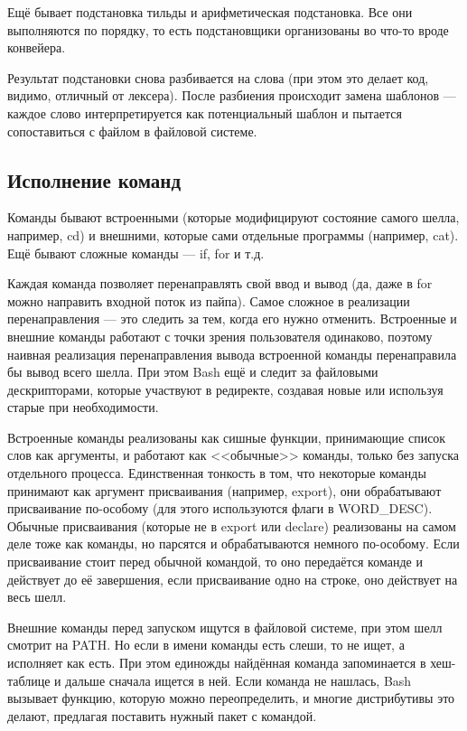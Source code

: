 \documentclass[a5paper]{article}
\begin{document}
Ещё бывает подстановка тильды и арифметическая подстановка. Все они выполняются по порядку, то есть подстановщики организованы во что-то вроде конвейера.

Результат подстановки снова разбивается на слова (при этом это делает код, видимо, отличный от лексера). После разбиения происходит замена шаблонов --- каждое слово интерпретируется как потенциальный шаблон и пытается сопоставиться с файлом в файловой системе.

\subsection{Исполнение команд}

Команды бывают встроенными (которые модифицируют состояние самого шелла, например, cd) и внешними, которые сами отдельные программы (например, cat). Ещё бывают сложные команды --- if, for и т.д.

Каждая команда позволяет перенаправлять свой ввод и вывод (да, даже в for можно направить входной поток из пайпа). Самое сложное в реализации перенаправления --- это следить за тем, когда его нужно отменить. Встроенные и внешние команды работают с точки зрения пользователя одинаково, поэтому наивная реализация перенаправления вывода встроенной команды перенаправила бы вывод всего шелла. При этом Bash ещё и следит за файловыми дескрипторами, которые участвуют в редиректе, создавая новые или используя старые при необходимости.

Встроенные команды реализованы как сишные функции, принимающие список слов как аргументы, и работают как <<обычные>> команды, только без запуска отдельного процесса. Единственная тонкость в том, что некоторые команды принимают как аргумент присваивания (например, export), они обрабатывают присваивание по-особому (для этого используются флаги в WORD\_DESC). Обычные присваивания (которые не в export или declare) реализованы на самом деле тоже как команды, но парсятся и обрабатываются немного по-особому. Если присваивание стоит перед обычной командой, то оно передаётся команде и действует до её завершения, если присваивание одно на строке, оно действует на весь шелл. 

Внешние команды перед запуском ищутся в файловой системе, при этом шелл смотрит на PATH. Но если в имени команды есть слеши, то не ищет, а исполняет как есть. При этом единожды найдённая команда запоминается в хеш-таблице и дальше сначала ищется в ней. Если команда не нашлась, Bash вызывает функцию, которую можно переопределить, и многие дистрибутивы это делают, предлагая поставить нужный пакет с командой.
\end{document}
